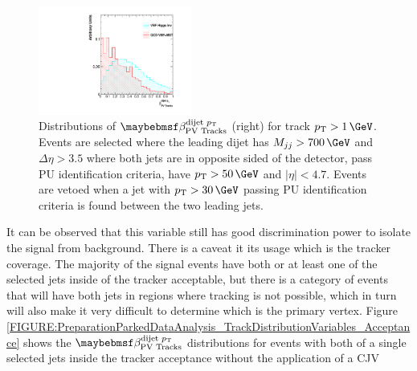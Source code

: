 \begin{figure}[!htb]
\centering
\includegraphics[width=0.45\textwidth]{Chapter06/TrackVariables/Images/Tracks1_CJVPass_TracksERation.pdf}
\caption{Distributions of $\beta_{\text{PV Tracks}}^{\text{dijet }\pt}$ (right) for track $\pt>1\,\GeV$. Events are selected where the leading dijet has $M_{jj}>700\,\GeV$ and $\Delta\eta>3.5$ where both jets are in opposite sided of the detector, pass \gls{PU} identification criteria, have $\pt>50\,\GeV$ and $|\eta|<4.7$. Events are vetoed when a jet with  $\pt>30\,\GeV$ passing \gls{PU} identification criteria is found between the two leading jets.}
\label{FIGURE:PreparationParkedDataAnalysis_TrackDistributionVariables_SelectionCJV}
\end{figure}

It can be observed that this variable still has good discrimination power to isolate the signal from background. There is a caveat it its usage which is the tracker coverage. The majority of the signal events have both or at least one of the selected jets inside of the tracker acceptable, but there is a category of events that will have both jets in regions where tracking is not possible, which in turn will also make it very difficult to determine which is the primary vertex. Figure \ref{FIGURE:PreparationParkedDataAnalysis_TrackDistributionVariables_Acceptance} shows the $\beta_{\text{PV Tracks}}^{\text{dijet }\pt}$ distributions for events with both of a single selected jets inside the tracker acceptance without the application of a \gls{CJV}

